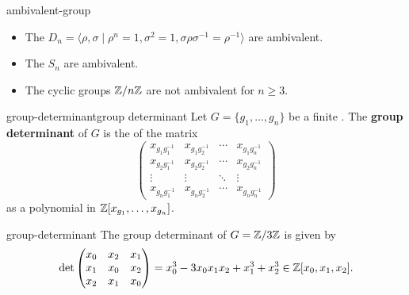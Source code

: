 \begin{example}{ambivalent-group}
    \begin{itemize}
        \item The  $D_n = \langle \rho, \sigma \mid \rho^n = 1, \sigma^2 = 1, \sigma \rho \sigma^{-1} = \rho^{-1} \rangle$ are ambivalent.
        \item The  $S_n$ are ambivalent.
        \item The cyclic groups $\mathbb{Z}/n\mathbb{Z}$ are not ambivalent for $n \ge 3$.
    \end{itemize}
\end{example}

\begin{topic}{group-determinant}{group determinant}
    Let $G = \{ g_1, \ldots, g_n \}$ be a finite . The \textbf{group determinant} of $G$ is the  of the matrix
    \[ \begin{pmatrix}
        x_{g_1 g_1^{-1}} & x_{g_1 g_2^{-1}} & \cdots & x_{g_1 g_n^{-1}} \\ 
        x_{g_2 g_1^{-1}} & x_{g_2 g_2^{-1}} & \cdots & x_{g_2 g_n^{-1}} \\ 
        \vdots & \vdots & \ddots & \vdots \\
        x_{g_n g_1^{-1}} & x_{g_n g_2^{-1}} & \cdots & x_{g_n g_n^{-1}}
    \end{pmatrix} \]
    as a polynomial in $\mathbb{Z}[x_{g_1}, \ldots, x_{g_n}]$.
\end{topic}

\begin{example}{group-determinant}
    The group determinant of $G = \mathbb{Z}/3\mathbb{Z}$ is given by
    \[ \det \begin{pmatrix} x_{0} & x_{2} & x_{1} \\ x_{1} & x_{0} & x_{2} \\ x_{2} & x_{1} & x_{0} \end{pmatrix} = x_{0}^{3} - 3 x_{0} x_{1} x_{2} + x_{1}^{3} + x_{2}^{3} \in \mathbb{Z}[x_0, x_1, x_2] . \]
\end{example}
